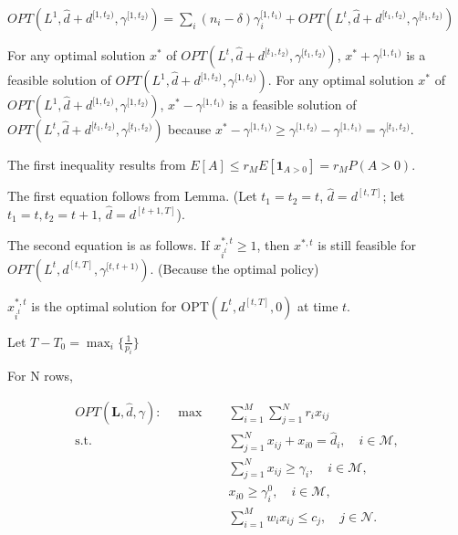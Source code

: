 \begin{lem}
$OPT(L^{1}, \hat{d} + d^{[1, t_2)} , \gamma^{[1, t_2)}) = \sum_{i} (n_{i} - \delta) \gamma_{i}^{[1, t_1)} + OPT(L^{t}, \hat{d}+d^{[t_1, t_2)}, \gamma^{[t_1, t_2)})$
\end{lem}

For any optimal solution $x^{*}$ of $OPT(L^{t}, \hat{d}+d^{[t_1, t_2)}, \gamma^{[t_1, t_2)})$, $x^{*} + \gamma^{[1, t_1)}$ is a feasible solution of $OPT(L^{1}, \hat{d}+d^{[1, t_2)}, \gamma^{[1, t_2)})$. For any optimal solution $x^{*}$ of $OPT(L^{1}, \hat{d}+d^{[1, t_2)}, \gamma^{[1, t_2)})$, $x^{*}- \gamma^{[1, t_1)}$ is a feasible solution of $OPT(L^{t}, \hat{d}+d^{[t_1, t_2)}, \gamma^{[t_1, t_2)})$ because $x^{*}- \gamma^{[1, t_1)} \geq \gamma^{[1, t_{2})}- \gamma^{[1, t_1)} = \gamma^{[t_1, t_2)}$.


The first inequality results from $E[A] \leq r_{M} E[\bm{1}_{A>0}] = r_{M} P(A>0)$.

The first equation follows from Lemma. (Let $t_1 = t_2 = t$, $\hat{d} = d^{[t, T]}$; let $t_1 = t, t_2 = t+1$, $\hat{d} = d^{[t+1, T]}$).

The second equation is as follows. If $x_{i^{t}}^{*,t} \geq 1$, then $x^{*,t}$ is still feasible for $OPT(L^{t}, d^{[t, T]}, \gamma^{[t,t+1)})$. (Because the optimal policy)

$x_{i^{t}}^{*,t}$ is the optimal solution for $\text{OPT}(L^{t}, d^{[t, T]}, 0)$ at time $t$.

Let $T- T_{0} = \max_{i}\{\frac{1}{p_{i}}\}$


For N rows,

\begin{align*}
    OPT(\bm{L}, \hat{d}, \gamma): \quad \max \quad & \sum_{i = 1}^{M} \sum_{j = 1}^{N} r_{i} x_{ij} \\
    \text {s.t.} \quad & \sum_{j=1}^{N} x_{ij} + x_{i0} = \hat{d}_{i}, \quad i \in \mathcal{M},  \\ 
    & \sum_{j=1}^{N} x_{ij} \geq \gamma_{i}, \quad i \in \mathcal{M}, \\
    & x_{i0} \geq \gamma_{i}^{0}, \quad i \in \mathcal{M}, \\
    & \sum_{i=1}^{M} w_{i} x_{ij} \leq c_{j}, \quad j \in \mathcal{N}.
\end{align*}

